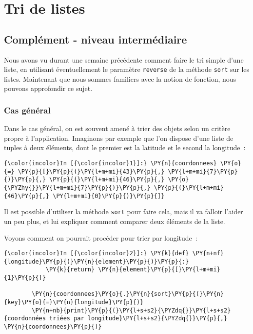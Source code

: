     
    
    
    

    

    \hypertarget{tri-de-listes}{%
\section{Tri de listes}\label{tri-de-listes}}

    \hypertarget{compluxe9ment---niveau-intermuxe9diaire}{%
\subsection{Complément - niveau
intermédiaire}\label{compluxe9ment---niveau-intermuxe9diaire}}

    Nous avons vu durant une semaine précédente comment faire le tri simple
d'une liste, en utilisant éventuellement le paramètre \texttt{reverse}
de la méthode \texttt{sort} sur les listes. Maintenant que nous sommes
familiers avec la notion de fonction, nous pouvons approfondir ce sujet.

    \hypertarget{cas-guxe9nuxe9ral}{%
\subsubsection{Cas général}\label{cas-guxe9nuxe9ral}}

    Dans le cas général, on est souvent amené à trier des objets selon un
critère propre à l'application. Imaginons par exemple que l'on dispose
d'une liste de tuples à deux éléments, dont le premier est la latitude
et le second la longitude~:

    \begin{Verbatim}[commandchars=\\\{\},frame=single,framerule=0.3mm,rulecolor=\color{cellframecolor}]
{\color{incolor}In [{\color{incolor}1}]:} \PY{n}{coordonnees} \PY{o}{=} \PY{p}{[}\PY{p}{(}\PY{l+m+mi}{43}\PY{p}{,} \PY{l+m+mi}{7}\PY{p}{)}\PY{p}{,} \PY{p}{(}\PY{l+m+mi}{46}\PY{p}{,} \PY{o}{\PYZhy{}}\PY{l+m+mi}{7}\PY{p}{)}\PY{p}{,} \PY{p}{(}\PY{l+m+mi}{46}\PY{p}{,} \PY{l+m+mi}{0}\PY{p}{)}\PY{p}{]}
\end{Verbatim}


    Il est possible d'utiliser la méthode \texttt{sort} pour faire cela,
mais il va falloir l'aider un peu plus, et lui expliquer comment
comparer deux éléments de la liste.

Voyons comment on pourrait procéder pour trier par longitude~:

    \begin{Verbatim}[commandchars=\\\{\},frame=single,framerule=0.3mm,rulecolor=\color{cellframecolor}]
{\color{incolor}In [{\color{incolor}2}]:} \PY{k}{def} \PY{n+nf}{longitude}\PY{p}{(}\PY{n}{element}\PY{p}{)}\PY{p}{:} 
            \PY{k}{return} \PY{n}{element}\PY{p}{[}\PY{l+m+mi}{1}\PY{p}{]}
        
        \PY{n}{coordonnees}\PY{o}{.}\PY{n}{sort}\PY{p}{(}\PY{n}{key}\PY{o}{=}\PY{n}{longitude}\PY{p}{)}
        \PY{n+nb}{print}\PY{p}{(}\PY{l+s+s2}{\PYZdq{}}\PY{l+s+s2}{coordonnées triées par longitude}\PY{l+s+s2}{\PYZdq{}}\PY{p}{,} \PY{n}{coordonnees}\PY{p}{)}
\end{Verbatim}


